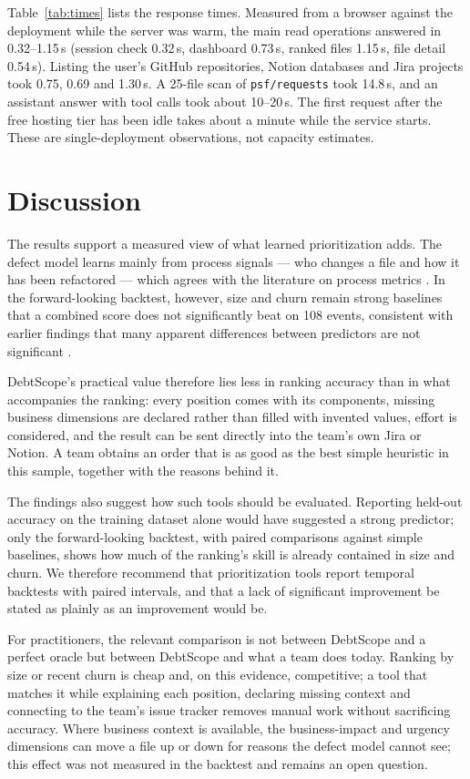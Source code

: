 \documentclass[conference]{IEEEtran}
\begin{document}
Table~\ref{tab:times} lists the response times.
Measured from a browser against the deployment while the server was warm, the main read operations answered in 0.32--1.15\,s (session check 0.32\,s, dashboard 0.73\,s, ranked files 1.15\,s, file detail 0.54\,s). Listing the user's GitHub repositories, Notion databases and Jira projects took 0.75, 0.69 and 1.30\,s. A 25-file scan of \texttt{psf/requests} took 14.8\,s, and an assistant answer with tool calls took about 10--20\,s. The first request after the free hosting tier has been idle takes about a minute while the service starts. These are single-deployment observations, not capacity estimates.

\section{Discussion}
The results support a measured view of what learned prioritization adds. The defect model learns mainly from process signals --- who changes a file and how it has been refactored --- which agrees with the literature on process metrics \cite{hall,kamei}. In the forward-looking backtest, however, size and churn remain strong baselines that a combined score does not significantly beat on 108 events, consistent with earlier findings that many apparent differences between predictors are not significant \cite{lessmann}.

DebtScope's practical value therefore lies less in ranking accuracy than in what accompanies the ranking: every position comes with its components, missing business dimensions are declared rather than filled with invented values, effort is considered, and the result can be sent directly into the team's own Jira or Notion. A team obtains an order that is as good as the best simple heuristic in this sample, together with the reasons behind it.

The findings also suggest how such tools should be evaluated. Reporting held-out accuracy on the training dataset alone would have suggested a strong predictor; only the forward-looking backtest, with paired comparisons against simple baselines, shows how much of the ranking's skill is already contained in size and churn. We therefore recommend that prioritization tools report temporal backtests with paired intervals, and that a lack of significant improvement be stated as plainly as an improvement would be.

For practitioners, the relevant comparison is not between DebtScope and a perfect oracle but between DebtScope and what a team does today. Ranking by size or recent churn is cheap and, on this evidence, competitive; a tool that matches it while explaining each position, declaring missing context and connecting to the team's issue tracker removes manual work without sacrificing accuracy. Where business context is available, the business-impact and urgency dimensions can move a file up or down for reasons the defect model cannot see; this effect was not measured in the backtest and remains an open question.
\end{document}
